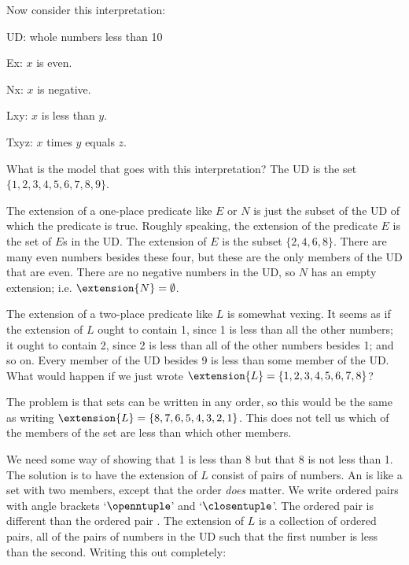 Now consider this interpretation:
\begin{ekey}
\item{UD:} whole numbers less than 10
\item{Ex:} $x$ is even.
\item{Nx:} $x$ is negative.
\item{Lxy:} $x$ is less than $y$.
\item{Txyz:} $x$ times $y$ equals $z$.
\end{ekey}
What is the model that goes with this interpretation?
The UD is the set $\{1,2,3,4,5,6,7,8,9\}$.

The extension of a one-place predicate like $E$ or $N$ is just the subset of the UD of which the predicate is true. Roughly speaking, the extension of the predicate $E$ is the set of $E$s in the UD.
The extension of $E$ is the subset $\{2,4,6,8\}$. There are many even numbers besides these four, but these are the only members of the UD that are even. There are no negative numbers in the UD, so $N$ has an empty extension; i.e. $\extension{N}=\emptyset$.


The extension of a two-place predicate like $L$ is somewhat vexing. It seems as if the extension of $L$ ought to contain 1, since 1 is less than all the other numbers; it ought to contain 2, since 2 is less than all of the other numbers besides 1; and so on. Every member of the UD besides 9 is less than some member of the UD. What would happen if we just wrote $\extension{L}=\{1,2,3,4,5,6,7,8\}$?

The problem is that sets can be written in any order, so this would be the same as writing $\extension{L}=\{8,7,6,5,4,3,2,1\}$. This does not tell us which of the members of the set are less than which other members.

We need some way of showing that 1 is less than 8 but that 8 is not less than 1. The solution is to have the extension of $L$ consist of pairs of numbers. An  is like a set with two members, except that the order \emph{does} matter. We write ordered pairs with angle brackets `$\openntuple$' and `$\closentuple$'. The ordered pair \mbox{} is different than the ordered pair \mbox{}. The extension of $L$ is a collection of ordered pairs, all of the pairs of numbers in the UD such that the first number is less than the second. Writing this out completely:



